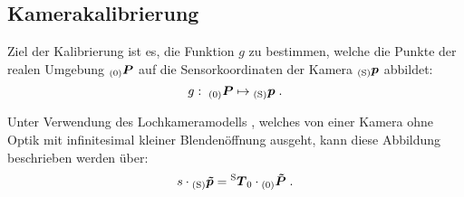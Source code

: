 %
%
%

\prever{
}

\subsection{Kamerakalibrierung}
\label{chap.calib}
Ziel der Kalibrierung ist es, die Funktion $g$ zu bestimmen, welche die Punkte der realen Umgebung ${_{{\mathrm{(0)}}}}\mbox{\boldmath{$P$}}$ auf die Sensorkoordinaten der Kamera ${_{{\mathrm{(S)}}}}\mbox{\boldmath{$p$}}$ abbildet:
%
\begin{equation}
g : \; {_{{\mathrm{(0)}}}}\mbox{\boldmath{$P$}} \mapsto {_{{\mathrm{(S)}}}}\mbox{\boldmath{$p$}} \; \text{.}
\end{equation}


\prever{
}
Unter Verwendung des Lochkameramodells \cite{Jaehne2012}, welches von einer Kamera ohne Optik mit infinitesimal kleiner Blendenöffnung ausgeht, kann diese Abbildung beschrieben werden über:
%
\begin{equation}
s \cdot {_{{\mathrm{(S)}}}}\mbox{\boldmath{$\tilde{p}$}} = {^{\mathrm{S}}\mbox{\boldmath{$T$}}_{\mathrm{0}}} \cdot {_{{\mathrm{(0)}}}}\mbox{\boldmath{$\tilde{P}$}} \; \text{.}
\label{eq.persp_abb}
\end{equation}

